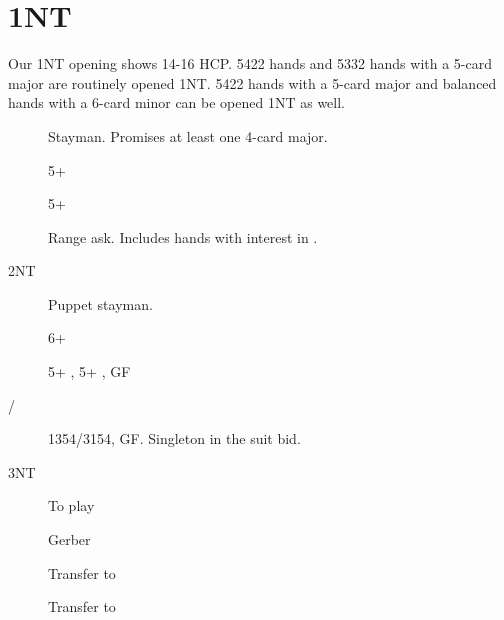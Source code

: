 \documentclass[tom-ari]{subfile}
\begin{document}
\chapter{1NT}

Our 1NT opening shows 14-16 HCP. 5422 hands and 5332 hands with a 5-card major are routinely opened 1NT.
5422 hands with a 5-card major and balanced hands with a 6-card minor can be opened 1NT as well.

\begin{description}
  \item[] Stayman. Promises at least one 4-card major.
  \item[] 5+ \heartsuit
  \item[] 5+ \spadesuit
  \item[] Range ask. Includes hands with interest in \clubsuit.
  \item[2NT] Puppet stayman.
  \item[] 6+ \diamondsuit
  \item[] 5+ \diamondsuit, 5+ \clubsuit, GF
  \item[/] 1354/3154, GF. Singleton in the suit bid.
  \item[3NT] To play
  \item[] Gerber
  \item[] Transfer to \heartsuit
  \item[] Transfer to \spadesuit
\end{description}
\end{document}
